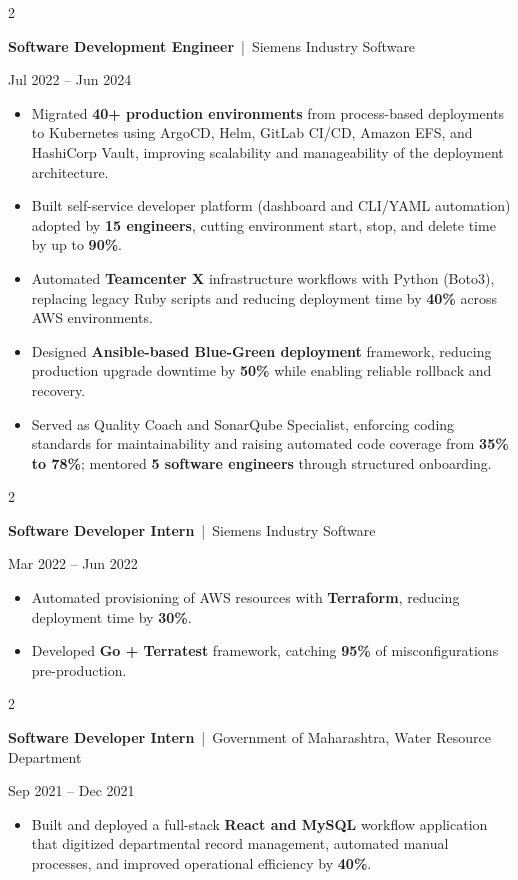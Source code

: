 \documentclass[10pt, letterpaper]{article}
\newenvironment{highlights}{
    \begin{itemize}[
        topsep=0.10 cm,
        parsep=0.06 cm,
        partopsep=0pt,
        itemsep=0.06 cm,
        leftmargin=12pt
    ]
}{
    \end{itemize}
}
\newenvironment{twocolentry}[2][]{
    \onecolentry
    \def\secondColumn{#2}
    \setcolumnwidth{\fill, 4.5 cm}
    \begin{paracol}{2}
}{
    \switchcolumn \raggedleft \secondColumn
    \end{paracol}
    \endonecolentry
}
\begin{document}
\vspace{0.15 cm}

\begin{twocolentry}{Jul 2022 -- Jun 2024}
\textbf{Software Development Engineer} \,|\, Siemens Industry Software
\end{twocolentry}
\begin{highlights}
  \item Migrated \textbf{40+ production environments} from process-based deployments to Kubernetes using ArgoCD, Helm, GitLab CI/CD, Amazon EFS, and HashiCorp Vault, improving scalability and manageability of the deployment architecture.
  \item Built self-service developer platform (dashboard and CLI/YAML automation) adopted by \textbf{15 engineers}, cutting environment start, stop, and delete time by up to \textbf{90\%}.
  \item Automated \textbf{Teamcenter X} infrastructure workflows with Python (Boto3), replacing legacy Ruby scripts and reducing deployment time by \textbf{40\%} across AWS environments.
  \item Designed \textbf{Ansible-based Blue-Green deployment} framework, reducing production upgrade downtime by \textbf{50\%} while enabling reliable rollback and recovery.
  \item Served as Quality Coach and SonarQube Specialist, enforcing coding standards for maintainability and raising automated code coverage from \textbf{35\% to 78\%}; mentored \textbf{5 software engineers} through structured onboarding.
\end{highlights}

\vspace{0.15 cm}

\begin{twocolentry}{Mar 2022 -- Jun 2022}
\textbf{Software Developer Intern} \,|\, Siemens Industry Software
\end{twocolentry}
\begin{highlights}
  \item Automated provisioning of AWS resources with \textbf{Terraform}, reducing deployment time by \textbf{30\%}.
  \item Developed \textbf{Go + Terratest} framework, catching \textbf{95\%} of misconfigurations pre-production.
\end{highlights}

\vspace{0.15 cm}

\begin{twocolentry}{Sep 2021 -- Dec 2021}
\textbf{Software Developer Intern} \,|\, Government of Maharashtra, Water Resource Department
\end{twocolentry}
\begin{highlights}
  \item Built and deployed a full-stack \textbf{React and MySQL} workflow application that digitized departmental record management, automated manual processes, and improved operational efficiency by \textbf{40\%}.
\end{highlights}
\end{document}
